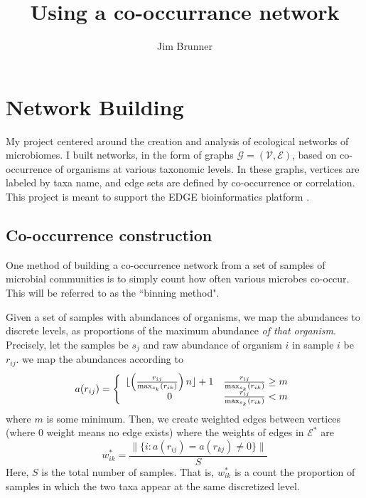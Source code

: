 \documentclass[10pt]{article}
\author{Jim Brunner}
\title{Using a co-occurrance network}
\theoremstyle{definition}
\numberwithin{theorem}{section}
\numberwithin{definition}{section}
\numberwithin{lemma}{section}
\numberwithin{corollary}{section}
\numberwithin{clm}{section}
\numberwithin{rmk}{section}
\newcommand{\cE}{\mathcal{E}}
\newcommand{\cG}{\mathcal{G}}
\newcommand{\cV}{\mathcal{V}}
\begin{document}
\maketitle
\section{Network Building}
My project centered around the creation and analysis of ecological networks of microbiomes. I built networks, in the form of graphs $\cG = (\cV, \cE)$, based on co-occurrence of organisms at various taxonomic levels. In these graphs, vertices are labeled by taxa name, and edge sets are defined by co-occurrence or correlation. This project is meant to support the EDGE bioinformatics platform \cite{edge}. 

\subsection{Co-occurrence construction}
One method of building a co-occurrence network from a set of samples of microbial communities is to simply count how often various microbes co-occur. This will be referred to as the ``binning method". 

Given a set of samples with abundances of organisms, we map the abundances to discrete levels, as proportions of the maximum abundance \emph{of that organism}. Precisely, let the samples be $s_j$ and raw abundance of organism $i$ in sample $i$ be $r_{ij}$. we map the abundances according to
\[
a(r_{ij})  = \left\{
\begin{array}{c c}
\lfloor\left(\frac{r_{ij}}{\max_{s_k}(r_{ik})}\right) n \rfloor + 1 &  \frac{r_{ij}}{\max_{s_k}(r_{ik})} \geq m \\
0 & \frac{r_{ij}}{\max_{s_k}(r_{ik})} < m
\end{array}
\right.
\]
where $m$ is some minimum. Then, we create weighted edges between vertices (where $0$ weight means no edge exists) where the weights of edges in $\cE^*$ are
\[
w^*_{ik} = \frac{\|\{i: a(r_{ij}) = a(r_{kj}) \neq 0\} \|}{S}
\]
Here, $S$ is the total number of samples. That is, $w^*_{ik}$ is a count the proportion of samples in which the two taxa appear at the same discretized level. 
\end{document}
